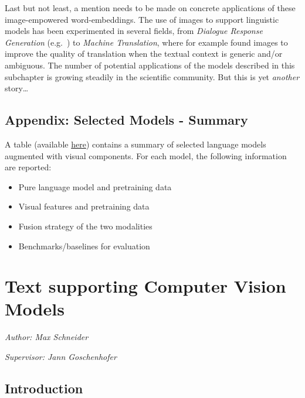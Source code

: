 \documentclass[
]{krantz}
\providecommand{\tightlist}{%
  \setlength{\itemsep}{0pt}\setlength{\parskip}{0pt}}
\begin{document}
Last but not least, a mention needs to be made on concrete applications of these image-empowered word-embeddings. The use of images to support linguistic models has been experimented in several fields, from \emph{Dialogue Response Generation} (e.g.~\citet{sun2021multimodal}) to \emph{Machine Translation}, where for example \citet{ive2019distilling} found images to improve the quality of translation when the textual context is generic and/or ambiguous. The number of potential applications of the models described in this subchapter is growing steadily in the scientific community. But this is yet \emph{another} story\ldots{}

\hypertarget{appendix-selected-models---summary}{%
\subsection{Appendix: Selected Models - Summary}\label{appendix-selected-models---summary}}

A table (available \href{https://github.com/slds-lmu/seminar_multimodal_dl/blob/master/Table-ch2-3-final.pdf}{here}) contains a summary of selected language models augmented with visual components. For each model, the following information are reported:

\begin{itemize}
\tightlist
\item
  Pure language model and pretraining data
\item
  Visual features and pretraining data
\item
  Fusion strategy of the two modalities
\item
  Benchmarks/baselines for evaluation
\end{itemize}

\hypertarget{c02-04-text-support-img}{%
\section{Text supporting Computer Vision Models}\label{c02-04-text-support-img}}

\emph{Author: Max Schneider}

\emph{Supervisor: Jann Goschenhofer}

\hypertarget{introduction-2}{%
\subsection{Introduction}\label{introduction-2}}
\end{document}
